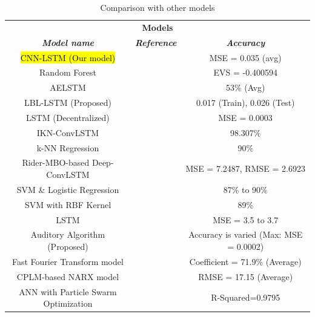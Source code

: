 \documentclass[conference]{IEEEtran}
\begin{document}
\begin{table}[!htbp]
	\caption{Comparison with other models}
	\begin{center}
		\begin{tabular}{|c|c|c|}
			\hline
			\multicolumn{3}{|c|}{\textbf{Models}} \\
			\cline{1-3} 
			\textbf{\textit{Model name}}& \textbf{\textit{Reference}}& \textbf{\textit{Accuracy}} \\
			\hline
			\hl{CNN-LSTM (Our model)} & & MSE = 0.035 (avg)  \\
			\hline
			Random Forest & \cite{b1} & EVS = -0.400594 \\
			\hline
			AELSTM & \cite{b2} & 53\% (Avg) \\
			\hline
			LBL-LSTM (Proposed) & \cite{b3} & 0.017 (Train), 0.026 (Test) \\
			\hline
			LSTM (Decentralized) & \cite{b9} & MSE = 0.0003 \\
			\hline
			IKN-ConvLSTM & \cite{b14} & 98.307\% \\
			\hline
			k-NN Regression & \cite{b15} & 90\% \\
			\hline
			Rider-MBO-based Deep-ConvLSTM & \cite{b16} & MSE = 7.2487, RMSE = 2.6923 \\
			\hline
			SVM \& Logistic Regression & \cite{b17} & 87\% to 90\% \\
			\hline
			SVM with RBF Kernel & \cite{b18} & 89\% \\
			\hline
			LSTM & \cite{b19} & MSE = 3.5 to 3.7 \\
			\hline
			Auditory Algorithm (Proposed) & \cite{b20} & Accuracy is varied (Max: MSE = 0.0002) \\
			\hline
			Fast Fourier Transform model & \cite{b21} & Coefficient = 71.9\% (Average) \\
			\hline
			CPLM-based NARX model & \cite{b22} & RMSE = 17.15 (Average) \\
			\hline
			ANN with Particle Swarm Optimization & \cite{b23} & R-Squared=0.9795 \\
			\hline
		\end{tabular}
		\label{tab1}
	\end{center}
\end{table}

\FloatBarrier
\end{document}
